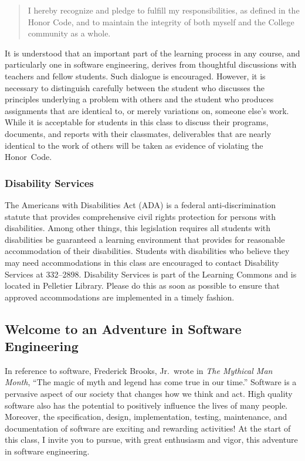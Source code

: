 \documentclass[11pt]{article}
\begin{document}
\vspace*{-.10in}
%
\begin{quote}
%
  I hereby recognize and pledge to fulfill my responsibilities, as defined in
  the Honor Code, and to maintain the integrity of both myself and the College
  community as a whole.
%
\end{quote}
%
\vspace*{-.10in}

\noindent It is understood that an important part of the learning process in any
course, and particularly one in software engineering, derives from thoughtful
discussions with teachers and fellow students. Such dialogue is encouraged.
However, it is necessary to distinguish carefully between the student who
discusses the principles underlying a problem with others and the student who
produces assignments that are identical to, or merely variations on, someone
else's work. While it is acceptable for students in this class to discuss their
programs, documents, and reports with their classmates, deliverables that are
nearly identical to the work of others will be taken as evidence of violating
the \mbox{Honor Code}.

\subsubsection*{Disability Services}

The Americans with Disabilities Act (ADA) is a federal anti-discrimination
statute that provides comprehensive civil rights protection for persons with
disabilities. Among other things, this legislation requires all students with
disabilities be guaranteed a learning environment that provides for reasonable
accommodation of their disabilities. Students with disabilities who believe they
may need accommodations in this class are encouraged to contact Disability
Services at 332--2898. Disability Services is part of the Learning Commons and
is located in Pelletier Library. Please do this as soon as possible to ensure
that approved accommodations are implemented in a timely fashion.

\subsection*{Welcome to an Adventure in Software Engineering}

In reference to software, Frederick Brooks, Jr.\ wrote in {\em The Mythical Man
Month}, ``The magic of myth and legend has come true in our time.'' Software is
a pervasive aspect of our society that changes how we think and act. High
quality software also has the potential to positively influence the lives of
many people. Moreover, the specification, design, implementation, testing,
maintenance, and documentation of software are exciting and rewarding
activities! At the start of this class, I invite you to pursue, with great
enthusiasm and vigor, this adventure in software engineering.
\end{document}
